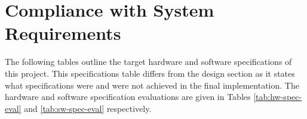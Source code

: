 \documentclass[letterpaper,11pt]{article}
\begin{document}


\section{Compliance with System Requirements} %

The following tables outline the target hardware and software specifications of
this project. This specifications table differs from the design section as it
states what specifications were and were not achieved in the final
implementation. The hardware and software specification evaluations are given in
Tables \ref{tab:hw-spec-eval} and \ref{tab:sw-spec-eval} respectively.
\end{document}
